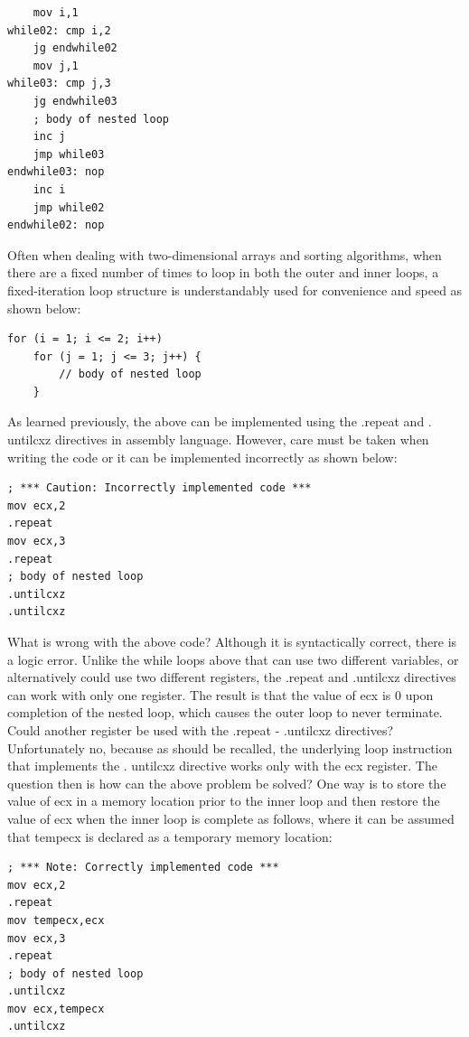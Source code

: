 \documentclass[10pt]{book}
\begin{document}
\begin{verbatim}
    mov i,1
while02: cmp i,2
    jg endwhile02
    mov j,1
while03: cmp j,3
    jg endwhile03
    ; body of nested loop
    inc j
    jmp while03
endwhile03: nop
    inc i
    jmp while02
endwhile02: nop
\end{verbatim}

Often when dealing with two-dimensional arrays and sorting algorithms, when there are a fixed number of times to loop in both the outer and inner loops, a fixed-iteration loop structure is understandably used for convenience and speed as shown below:


\begin{verbatim}
for (i = 1; i <= 2; i++)
    for (j = 1; j <= 3; j++) {
        // body of nested loop
    }
\end{verbatim}

As learned previously, the above can be implemented using the .repeat and . untilcxz directives in assembly language. However, care must be taken when writing the code or it can be implemented incorrectly as shown below:

\begin{verbatim}
; *** Caution: Incorrectly implemented code ***
mov ecx,2
.repeat
mov ecx,3
.repeat
; body of nested loop
.untilcxz
.untilcxz
\end{verbatim}

What is wrong with the above code? Although it is syntactically correct, there is a logic error. Unlike the while loops above that can use two different variables, or alternatively could use two different registers, the .repeat and .untilcxz directives can work with only one register. The result is that the value of ecx is 0 upon completion of the nested loop, which causes the outer loop to never terminate. Could another register be used with the .repeat - .untilcxz directives? Unfortunately no, because as should be recalled, the underlying loop instruction that implements the . untilcxz directive works only with the ecx register. The question then is how can the above problem be solved? One way is to store the\\
value of ecx in a memory location prior to the inner loop and then restore the value of ecx when the inner loop is complete as follows, where it can be assumed that tempecx is declared as a temporary memory location:


\begin{verbatim}
; *** Note: Correctly implemented code ***
mov ecx,2
.repeat
mov tempecx,ecx
mov ecx,3
.repeat
; body of nested loop
.untilcxz
mov ecx,tempecx
.untilcxz
\end{verbatim}
\end{document}
